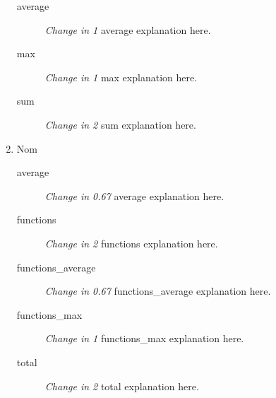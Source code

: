 \begin{enumerate}
\begin{description}
                  \item [average] \textit{Change in 1} average explanation here.
                  \item [max] \textit{Change in 1} max explanation here.
                  \item [sum] \textit{Change in 2} sum explanation here.
            \end{description}
      \item Nom
            \begin{description}
                  \item [average] \textit{Change in 0.67} average explanation here.
                  \item [functions] \textit{Change in 2} functions explanation here.
                  \item [functions\_average] \textit{Change in 0.67} functions\_average explanation here.
                  \item [functions\_max] \textit{Change in 1} functions\_max explanation here.
                  \item [total] \textit{Change in 2} total explanation here.
            \end{description}
\end{enumerate}
